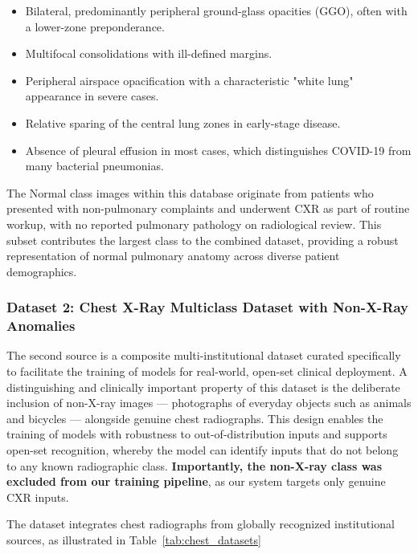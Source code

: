 \begin{itemize}
	\item Bilateral, predominantly peripheral ground-glass opacities (GGO), often with a lower-zone preponderance.
	\item Multifocal consolidations with ill-defined margins.
	\item Peripheral airspace opacification with a characteristic "white lung" appearance in severe cases.
	\item Relative sparing of the central lung zones in early-stage disease.
	\item Absence of pleural effusion in most cases, which distinguishes COVID-19 from many bacterial pneumonias.
\end{itemize}

The Normal class images within this database originate from patients who presented with non-pulmonary complaints and underwent CXR as part of routine workup, with no reported pulmonary pathology on radiological review. This subset contributes the largest class to the combined dataset, providing a robust representation of normal pulmonary anatomy across diverse patient demographics.

\subsubsection{Dataset 2: Chest X-Ray Multiclass Dataset with Non-X-Ray Anomalies}
The second source is a composite multi-institutional dataset curated specifically to facilitate the training of models for real-world, open-set clinical deployment. A distinguishing and clinically important property of this dataset is the deliberate inclusion of non-X-ray images --- photographs of everyday objects such as animals and bicycles --- alongside genuine chest radiographs. This design enables the training of models with robustness to out-of-distribution inputs and supports open-set recognition, whereby the model can identify inputs that do not belong to any known radiographic class. \textbf{Importantly, the non-X-ray class was excluded from our training pipeline}, as our system targets only genuine CXR inputs.

The dataset integrates chest radiographs from globally recognized institutional sources, as illustrated in Table~\ref{tab:chest_datasets}

